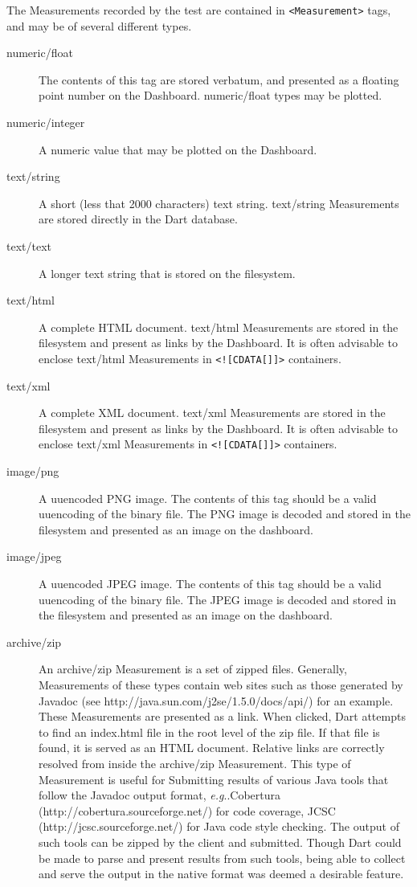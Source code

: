 \documentclass{InsightBook}
\makeatletter
\newcommand{\xmltag}[1]{\texttt{<#1>}}
\DeclareRobustCommand\onedot{\futurelet\@let@token\@onedot}
\def\@onedot{\ifx\@let@token.\else.\xspace\fi}
\def\eg{\emph{e.g}\onedot} \def\Eg{\emph{E.g}\onedot}
\makeatother
\begin{document}
The Measurements recorded by the test are contained in \xmltag{Measurement}
tags, and may be of several different types.

\begin{description}
  \item[numeric/float]{The contents of this tag are stored verbatum,
and presented as a floating point number on the Dashboard.
numeric/float types may be plotted.}
  \item[numeric/integer]{A numeric value that may be plotted on the
Dashboard.}
  \item[text/string]{A short (less that 2000 characters) text string.
text/string Measurements are stored directly in the Dart database.}
  \item[text/text]{A longer text string that is stored on the
filesystem.}
  \item[text/html]{A complete HTML document.  text/html Measurements
are stored in the filesystem and present as links by the Dashboard.
It is often advisable to enclose text/html Measurements in
\xmltag{![CDATA[]]} containers.}
  \item[text/xml]{A complete XML document.  text/xml Measurements
are stored in the filesystem and present as links by the Dashboard. 
It is often advisable to enclose text/xml Measurements in
\xmltag{![CDATA[]]} containers.}
  \item[image/png]{A uuencoded PNG image.  The contents of this tag
should be a valid uuencoding of the binary file.  The PNG image is
decoded and stored in the filesystem and presented as an image on the dashboard.}
  \item[image/jpeg]{A uuencoded JPEG image.  The contents of this tag
should be a valid uuencoding of the binary file.  The JPEG image is
decoded and stored in the filesystem and presented as an image on the
dashboard.}
  \item[archive/zip]{An archive/zip Measurement is a set of zipped
files.  Generally, Measurements of these types contain web sites such
as those generated by Javadoc (see
http://java.sun.com/j2se/1.5.0/docs/api/) for an example.  These
Measurements are presented as a link.  When clicked, Dart attempts to
find an index.html file in the root level of the zip file.  If that
file is found, it is served as an HTML document.  Relative links are
correctly resolved from inside the archive/zip Measurement.  This type
of Measurement is useful for Submitting results of various Java tools
that follow the Javadoc output format, \eg Cobertura
(http://cobertura.sourceforge.net/) for code coverage, JCSC
(http://jcsc.sourceforge.net/) for Java code style checking.  The
output of such tools can be zipped by the client and submitted.
Though Dart could be made to parse and present results from such
tools, being able to collect and serve the output in the native format
was deemed a desirable feature.}
\end{description}
\end{document}
